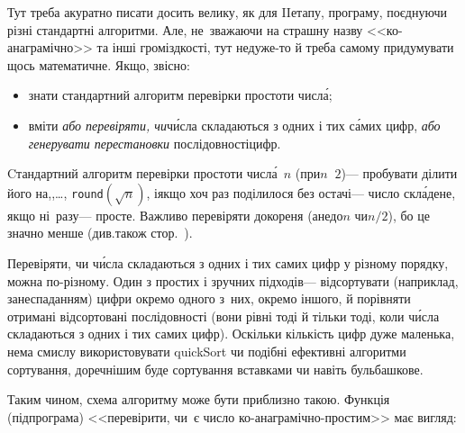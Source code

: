 \Tutorial	Тут треба акуратно писати досить велику, як для II\nolinebreak[3] етапу, програму, поєднуючи різні стандартні алгоритми. Але, не~зважаючи на страшну назву <<ко-ана\-гра\-мічно>> та інші громіздкості, тут не\nolinebreak[3] дуже-то й треба самому придумувати щось математичне. Якщо, звісно:

\begin{itemize}[leftmargin=*,itemsep=0pt,partopsep=0pt,topsep=0pt,parsep=0pt]

\item
знати стандартний алгоритм перевірки простоти числ\'{а};

\item
вміти \emph{або перевіряти, чи}\nolinebreak[2] ч\'{и}сла складаються з одних і тих с\'{а}мих цифр, \emph{або генерувати перестановки} послідовності\nolinebreak[3] цифр.

\end{itemize}

Cтандартний алгоритм перевірки простоти числ\'{а}~$n$ (при\nolinebreak[2] ${n\,{\>}\,2}$)\nolinebreak[3] --- пробувати ділити його на,,\nolinebreak[3] \dots, \verb"round"$(\sqrt{n})$, і\nolinebreak[3] якщо хоч раз поділилося без остачі\nolinebreak[3] --- число скл\'{а}дене, якщо %
ні~разу\nolinebreak[3] --- просте. Важливо перевіряти до\nolinebreak[2] кореня (а\nolinebreak[3] не\nolinebreak[2] до\nolinebreak[3] $n$ чи\nolinebreak[2] $n/2$), бо це значно менше (див.\nolinebreak[2] також стор.~\pageref{text:about-sqrt-n-in-divisors-list}).

Перевіряти, чи ч\'{и}сла складаються з одних і тих самих цифр у різному порядку, можна по-різному. Один з простих і зручних підходів\nolinebreak[3] --- відсортувати (наприклад, за\nolinebreak[3] неспаданням) цифри окремо одного з~них, окремо іншого, й порівняти отримані відсортовані послідовності (вони рівні тоді й тільки тоді, коли ч\'{и}сла складаються з одних і тих самих цифр). Оскільки кількість цифр дуже маленька, нема смислу використовувати quickSort чи подібні ефективні алгоритми сортування, доречнішим буде сортування вставками чи навіть бульбашкове.

Таким чином, схема алгоритму може бути приблизно такою. 
Функція (підпрограма) <<перевірити, чи~є число ко-анаграмічно-простим>> має вигляд:


